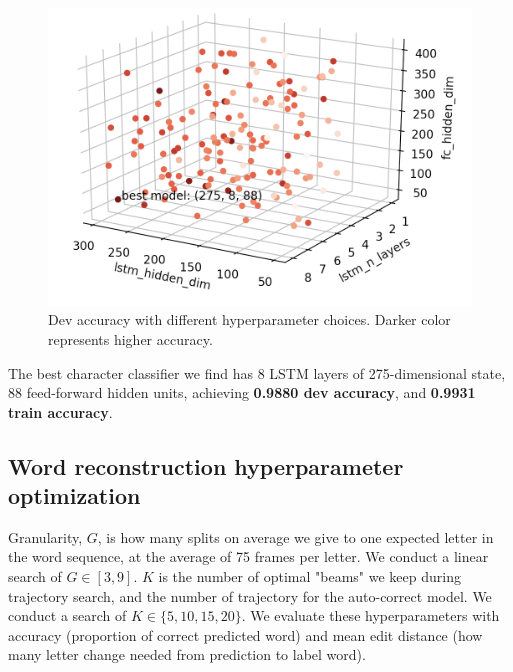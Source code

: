 \documentclass{article}
\begin{document}
\begin{multicols*}{2}
\vspace{-15px}
\begin{figure}[H]
    \centering
    \includegraphics[scale = 0.25]{hyperparam_search.png}
    \caption{Dev accuracy with different hyperparameter choices. Darker color represents higher accuracy.}
\end{figure}
\vspace{-10px}

The best character classifier we find has 8 LSTM layers of 275-dimensional state, 88 feed-forward hidden units, achieving \textbf{0.9880 dev accuracy}, and \textbf{0.9931 train accuracy}.

\subsection{Word reconstruction hyperparameter optimization}

Granularity, $G$, is how many splits on average we give to one expected letter in the word sequence, at the average of 75 frames per letter. We conduct a linear search of $G \in [3,9]$. $K$ is the number of optimal "beams" we keep during trajectory search, and the number of trajectory for the auto-correct model. We conduct a search of $K \in \{5, 10, 15,20\}$. We evaluate these hyperparameters with accuracy (proportion of correct predicted word) and mean edit distance (how many letter change needed from prediction to label word).



\end{multicols*}
\end{document}
